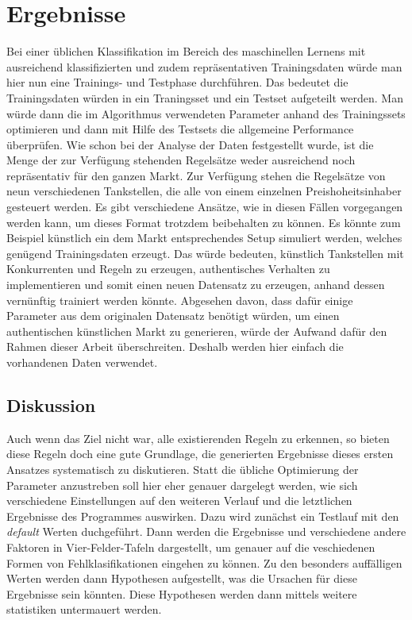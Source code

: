 \chapter{Ergebnisse}
\label{sec:Ergebnisse}

Bei einer üblichen Klassifikation im Bereich des maschinellen Lernens mit ausreichend klassifizierten und zudem repräsentativen Trainingsdaten würde man hier nun eine Trainings- und Testphase durchführen. Das bedeutet die Trainingsdaten würden in ein Traningsset und ein Testset aufgeteilt werden. Man würde dann die im Algorithmus verwendeten Parameter anhand des Trainingssets optimieren und dann mit Hilfe des Testsets die allgemeine Performance überprüfen. Wie schon bei der Analyse der Daten festgestellt wurde, ist die Menge der zur Verfügung stehenden Regelsätze weder ausreichend noch repräsentativ für den ganzen Markt. Zur Verfügung stehen die Regelsätze von neun verschiedenen Tankstellen, die alle von einem einzelnen Preishoheitsinhaber gesteuert werden. Es gibt verschiedene Ansätze, wie in diesen Fällen vorgegangen werden kann, um dieses Format trotzdem beibehalten zu können. Es könnte zum Beispiel künstlich ein dem Markt entsprechendes Setup simuliert werden, welches genügend Trainingsdaten erzeugt. Das würde bedeuten, künstlich Tankstellen mit Konkurrenten und Regeln zu erzeugen, authentisches Verhalten zu implementieren und somit einen neuen Datensatz zu erzeugen, anhand dessen vernünftig trainiert werden könnte. Abgesehen davon, dass dafür einige Parameter aus dem originalen Datensatz benötigt würden, um einen authentischen künstlichen Markt zu generieren, würde der Aufwand dafür den Rahmen dieser Arbeit überschreiten. Deshalb werden hier einfach die vorhandenen Daten verwendet.  

\section{Diskussion}
Auch wenn das Ziel nicht war, alle existierenden Regeln zu erkennen, so bieten diese Regeln doch eine gute Grundlage, die generierten Ergebnisse dieses ersten Ansatzes systematisch zu diskutieren. Statt die übliche Optimierung der Parameter  anzustreben soll hier eher genauer dargelegt werden, wie sich verschiedene Einstellungen auf den weiteren Verlauf und die letztlichen Ergebnisse des Programmes auswirken. Dazu wird zunächst ein Testlauf mit den \textit{default} Werten duchgeführt. Dann werden die Ergebnisse und verschiedene andere Faktoren in Vier-Felder-Tafeln dargestellt, um genauer auf die veschiedenen Formen von Fehlklasifikationen eingehen zu können. Zu den besonders auffälligen Werten werden dann Hypothesen aufgestellt, was die Ursachen für diese Ergebnisse sein könnten. Diese Hypothesen werden dann mittels weitere statistiken untermauert werden.

